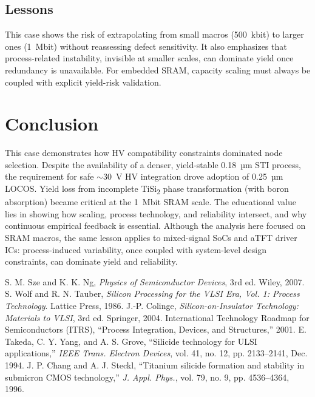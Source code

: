 \documentclass[conference]{IEEEtran}
\begin{document}
\subsection{Lessons}
This case shows the risk of extrapolating from small macros (500~kbit) to larger ones (1~Mbit) without reassessing defect sensitivity.
It also emphasizes that process-related instability, invisible at smaller scales, can dominate yield once redundancy is unavailable.
For embedded SRAM, capacity scaling must always be coupled with explicit yield-risk validation.

\section{Conclusion}
This case demonstrates how HV compatibility constraints dominated node selection.
Despite the availability of a denser, yield-stable 0.18~µm STI process, the requirement for safe $\sim$30~V HV integration drove adoption of 0.25~µm LOCOS.
Yield loss from incomplete TiSi\textsubscript{2} phase transformation (with boron absorption) became critical at the 1~Mbit SRAM scale.
The educational value lies in showing how scaling, process technology, and reliability intersect, and why continuous empirical feedback is essential.
Although the analysis here focused on SRAM macros, the same lesson applies to mixed-signal SoCs and aTFT driver ICs: process-induced variability, once coupled with system-level design constraints, can dominate yield and reliability.

\begin{thebibliography}{99}
 S. M. Sze and K. K. Ng, \textit{Physics of Semiconductor Devices}, 3rd ed. Wiley, 2007.
 S. Wolf and R. N. Tauber, \textit{Silicon Processing for the VLSI Era, Vol. 1: Process Technology}. Lattice Press, 1986.
 J.-P. Colinge, \textit{Silicon-on-Insulator Technology: Materials to VLSI}, 3rd ed. Springer, 2004.
 International Technology Roadmap for Semiconductors (ITRS), ``Process Integration, Devices, and Structures,'' 2001.
 E. Takeda, C. Y. Yang, and A. S. Grove, ``Silicide technology for ULSI applications,'' \textit{IEEE Trans. Electron Devices}, vol. 41, no. 12, pp. 2133--2141, Dec. 1994.
 J. P. Chang and A. J. Steckl, ``Titanium silicide formation and stability in submicron CMOS technology,'' \textit{J. Appl. Phys.}, vol. 79, no. 9, pp. 4536--4364, 1996.
\end{thebibliography}
\end{document}
